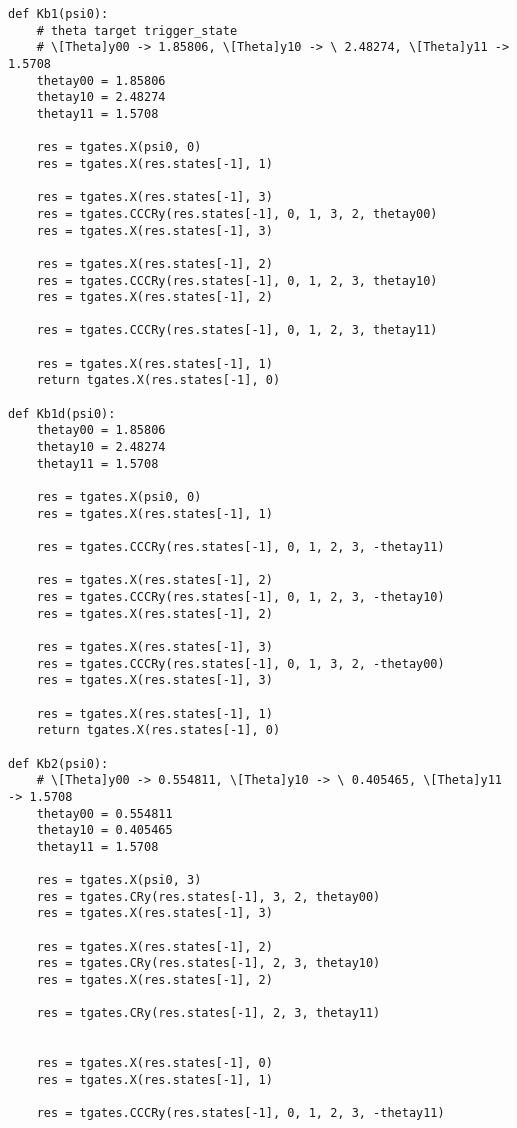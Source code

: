 \begin{verbatim}
def Kb1(psi0):
    # theta target trigger_state
    # \[Theta]y00 -> 1.85806, \[Theta]y10 -> \ 2.48274, \[Theta]y11 -> 1.5708
    thetay00 = 1.85806
    thetay10 = 2.48274
    thetay11 = 1.5708

    res = tgates.X(psi0, 0)
    res = tgates.X(res.states[-1], 1)

    res = tgates.X(res.states[-1], 3)
    res = tgates.CCCRy(res.states[-1], 0, 1, 3, 2, thetay00)
    res = tgates.X(res.states[-1], 3)

    res = tgates.X(res.states[-1], 2)
    res = tgates.CCCRy(res.states[-1], 0, 1, 2, 3, thetay10)
    res = tgates.X(res.states[-1], 2)

    res = tgates.CCCRy(res.states[-1], 0, 1, 2, 3, thetay11)

    res = tgates.X(res.states[-1], 1)
    return tgates.X(res.states[-1], 0)

def Kb1d(psi0):
    thetay00 = 1.85806
    thetay10 = 2.48274
    thetay11 = 1.5708

    res = tgates.X(psi0, 0)
    res = tgates.X(res.states[-1], 1)

    res = tgates.CCCRy(res.states[-1], 0, 1, 2, 3, -thetay11)

    res = tgates.X(res.states[-1], 2)
    res = tgates.CCCRy(res.states[-1], 0, 1, 2, 3, -thetay10)
    res = tgates.X(res.states[-1], 2)

    res = tgates.X(res.states[-1], 3)
    res = tgates.CCCRy(res.states[-1], 0, 1, 3, 2, -thetay00)
    res = tgates.X(res.states[-1], 3)

    res = tgates.X(res.states[-1], 1)
    return tgates.X(res.states[-1], 0)

def Kb2(psi0):
    # \[Theta]y00 -> 0.554811, \[Theta]y10 -> \ 0.405465, \[Theta]y11 -> 1.5708
    thetay00 = 0.554811
    thetay10 = 0.405465
    thetay11 = 1.5708

    res = tgates.X(psi0, 3)
    res = tgates.CRy(res.states[-1], 3, 2, thetay00)
    res = tgates.X(res.states[-1], 3)

    res = tgates.X(res.states[-1], 2)
    res = tgates.CRy(res.states[-1], 2, 3, thetay10)
    res = tgates.X(res.states[-1], 2)

    res = tgates.CRy(res.states[-1], 2, 3, thetay11)


    res = tgates.X(res.states[-1], 0)
    res = tgates.X(res.states[-1], 1)

    res = tgates.CCCRy(res.states[-1], 0, 1, 2, 3, -thetay11)


\end{verbatim}
